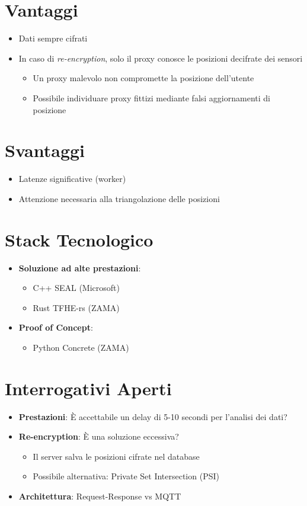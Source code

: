 \documentclass[12pt,a4paper,twoside]{book}
\begin{document}
\section{Vantaggi}
\begin{itemize}
    \item Dati sempre cifrati
    \item In caso di \emph{re-encryption}, solo il proxy conosce le posizioni decifrate dei sensori
    \begin{itemize}
        \item Un proxy malevolo non compromette la posizione dell'utente
        \item Possibile individuare proxy fittizi mediante falsi aggiornamenti di posizione
    \end{itemize}
\end{itemize}

\section{Svantaggi}
\begin{itemize}
    \item Latenze significative (worker)
    \item Attenzione necessaria alla triangolazione delle posizioni
\end{itemize}

\section{Stack Tecnologico}
\begin{itemize}
    \item \textbf{Soluzione ad alte prestazioni}:
    \begin{itemize}
        \item C++ SEAL (Microsoft)
        \item Rust TFHE-rs (ZAMA)
    \end{itemize}
    \item \textbf{Proof of Concept}:
    \begin{itemize}
        \item Python Concrete (ZAMA)
    \end{itemize}
\end{itemize}

\section{Interrogativi Aperti}
\begin{itemize}
    \item \textbf{Prestazioni}: È accettabile un delay di 5-10 secondi per l'analisi dei dati?
    \item \textbf{Re-encryption}: È una soluzione eccessiva?
    \begin{itemize}
        \item Il server salva le posizioni cifrate nel database
        \item Possibile alternativa: Private Set Intersection (PSI)
    \end{itemize}
    \item \textbf{Architettura}: Request-Response vs MQTT
\end{itemize}
\end{document}
